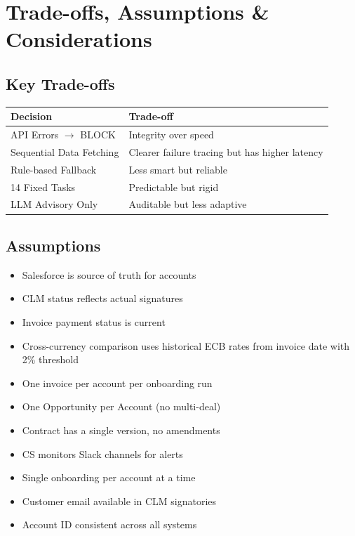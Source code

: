 \documentclass[8pt,a4paper]{article}
\begin{document}
\section{Trade-offs, Assumptions \& Considerations}

\begin{minipage}[t]{0.32\textwidth}
\vspace{0pt}
\subsection{Key Trade-offs}
\begin{table}[H]
\scriptsize
\begin{tabularx}{\textwidth}{@{}l>{\RaggedRight\arraybackslash}X@{}}
\toprule
\textbf{Decision} & \textbf{Trade-off} \\
\midrule
API Errors $\rightarrow$ BLOCK & Integrity over speed \\
Sequential Data Fetching & Clearer failure tracing but has higher latency \\
Rule-based Fallback & Less smart but reliable \\
14 Fixed Tasks & Predictable but rigid \\
LLM Advisory Only & Auditable but less adaptive \\
\bottomrule
\end{tabularx}
\end{table}
\end{minipage}
\hfill
\begin{minipage}[t]{0.32\textwidth}
\subsection{Assumptions}
{\scriptsize
\vspace{6pt}
\begin{itemize}
\item Salesforce is source of truth for accounts
\item CLM status reflects actual signatures
\item Invoice payment status is current
\item Cross-currency comparison uses historical ECB rates from invoice date with 2\% threshold
\item One invoice per account per onboarding run
\item One Opportunity per Account (no multi-deal)
\item Contract has a single version, no amendments
\item CS monitors Slack channels for alerts
\item Single onboarding per account at a time
\item Customer email available in CLM signatories
\item Account ID consistent across all systems
\end{itemize}
}
\end{minipage}
\end{document}
